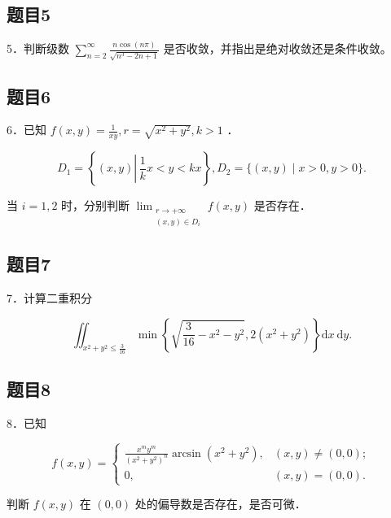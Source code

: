 \documentclass{article}
\begin{document}
\subsection{题目5}
5．判断级数 \(\sum_{n=2}^{\infty} \frac{n \cos (n \pi)}{\sqrt{n^{3}-2 n+1}}\) 是否收敛，并指出是绝对收敛还是条件收敛。

\subsection{题目6}
6．已知 \(f(x, y)=\frac{1}{x y}, r=\sqrt{x^{2}+y^{2}}, k>1\) ．

\[
D_{1}=\left\{(x, y) \left\lvert\, \frac{1}{k} x<y<k x\right.\right\}, D_{2}=\{(x, y) \mid x>0, y>0\} .
\]

当 \(i=1,2\) 时，分别判断 \(\lim _{\substack{r \rightarrow+\infty \\(x, y) \in D_{i}}} f(x, y)\) 是否存在．

\subsection{题目7}
7．计算二重积分

\[
\iint_{x^{2}+y^{2} \leq \frac{3}{16}} \min \left\{\sqrt{\frac{3}{16}-x^{2}-y^{2}}, 2\left(x^{2}+y^{2}\right)\right\} \mathrm{d} x \mathrm{~d} y .
\]

\subsection{题目8}
8．已知

\[
f(x, y)= \begin{cases}\frac{x^{m} y^{m}}{\left(x^{2}+y^{2}\right)^{n}} \arcsin \left(x^{2}+y^{2}\right), & (x, y) \neq(0,0) ; \\ 0, & (x, y)=(0,0) .\end{cases}
\]

判断 \(f(x, y)\) 在 \((0,0)\) 处的偏导数是否存在，是否可微．
\end{document}
